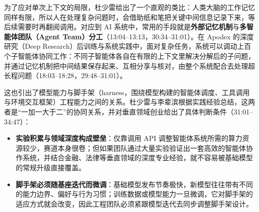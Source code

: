 \documentclass[UTF8,a4paper,11pt,fontset=fandol]{ctexart}
\begin{document}
为了应对单次上下文的局限，杜少雷给出了一个直观的类比：人类大脑的工作记忆同样有限，所以人在处理复杂问题时，会借助纸和笔把关键中间信息记录下来，等后续需要时再翻阅调用。对应到 AI 系统中，常用的手段就是\textbf{外部记忆机制}与\textbf{多智能体团队（Agent Team）分工}（13:04–13:13，30:34–31:01）。在 Apodex 的深度研究（Deep Research）后训练与系统实践中，面对复杂任务，系统可以调动上百个子智能体协同工作：不同子智能体各自在有限的上下文里解决分解后的子问题，并通过记忆机制把中间结果保存起来、互相分享与核对，由整个系统配合去处理超长程问题（18:03–18:28，29:48–31:01）。

这也引出了模型能力与脚手架（harness，围绕模型构建的智能体调度、工具调用与环境交互框架）工程能力之间的关系。杜少雷与李辈滨根据实践经验总结，这两者是“一加一大于二”的协同关系，并对垂直领域创业给出了具体判断条件（31:01–34:47）：
\begin{itemize}
\item \textbf{实验积累与领域深度构成壁垒}：仅靠调用 API 调整智能体系统所需的算力资源较少，赛道本身很卷；但如果团队通过大量实验验证出一套高效的智能体协作系统，并结合金融、法律等垂直领域的深度专业经验，就不容易被基础模型的常规升级直接覆盖。
\item \textbf{脚手架必须随基座迭代而微调}：基础模型发布节奏极快，新模型往往带有不同的能力边界、偏好与行为习惯；训练数据或模型能力一旦微调，它对脚手架的适应方式就会改变，因此工程团队必须紧跟模型迭代去同步调整脚手架设计。
\end{itemize}
\end{document}
